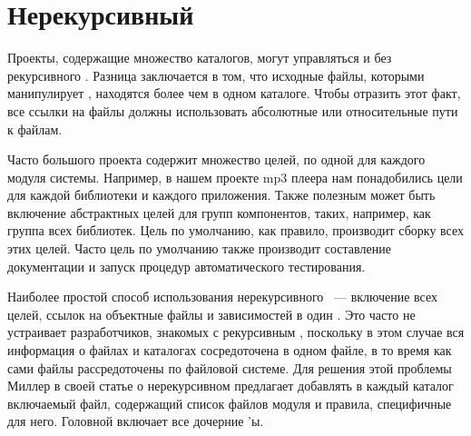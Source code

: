 \section{Нерекурсивный \GNUmake{}}

Проекты, содержащие множество каталогов, могут управляться и без
рекурсивного \GNUmake{}. Разница заключается в том, что исходные
файлы, которыми манипулирует \Makefile{}, находятся более чем в одном
каталоге.  Чтобы отразить этот факт, все ссылки на файлы
должны использовать абсолютные или относительные пути к файлам.

Часто \Makefile{} большого проекта содержит множество целей, по одной
для каждого модуля системы. Например, в нашем проекте mp3 плеера нам
понадобились цели для каждой библиотеки и каждого приложения. Также
полезным может быть включение абстрактных целей для групп компонентов,
таких, например, как группа всех библиотек. Цель по умолчанию, как
правило, производит сборку всех этих целей. Часто цель по умолчанию
также производит составление документации и запуск процедур
автоматического тестирования.

Наиболее простой способ использования нерекурсивного \GNUmake{}~---
включение всех целей, ссылок на объектные файлы и зависимостей в один
\Makefile{}. Это часто не устраивает разработчиков, знакомых с
рекурсивным \GNUmake{}, поскольку в этом случае вся информация о
файлах и каталогах сосредоточена в одном файле, в то время как сами
файлы рассредоточены по файловой системе. Для решения этой проблемы
Миллер в своей статье о нерекурсивном \GNUmake{} предлагает добавлять
в каждый каталог включаемый файл, содержащий список файлов модуля и
правила, специфичные для него. Головной \Makefile{} включает все
дочерние \Makefile{}'ы.

